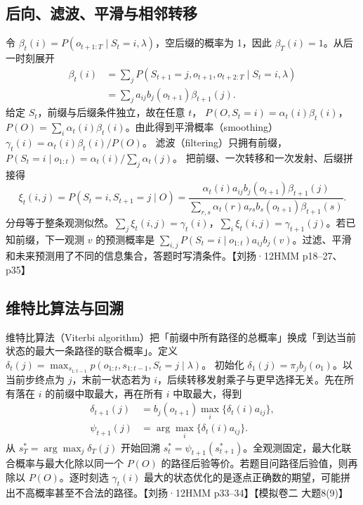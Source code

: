 \documentclass[UTF8,a4paper,zihao=-4,fontset=fandol]{ctexrep}
\begin{document}
\subsection{后向、滤波、平滑与相邻转移}
令 $\beta_t(i)=P(o_{t+1:T}\mid S_t=i,\lambda)$，空后缀的概率为 1，因此 $\beta_T(i)=1$。从后一时刻展开
\[
\begin{aligned}
\beta_t(i)
&=\sum_j P(S_{t+1}=j,o_{t+1},o_{t+2:T}\mid S_t=i,\lambda)\\
&=\sum_j a_{ij}b_j(o_{t+1})\beta_{t+1}(j).
\end{aligned}
\]
给定 $S_t$，前缀与后缀条件独立，故在任意 $t$，
$P(O,S_t=i)=\alpha_t(i)\beta_t(i)$，
$P(O)=\sum_i\alpha_t(i)\beta_t(i)$。由此得到平滑概率（smoothing）
$\gamma_t(i)=\alpha_t(i)\beta_t(i)/P(O)$。
滤波（filtering）只拥有前缀，$P(S_t=i\mid o_{1:t})=\alpha_t(i)/\sum_j\alpha_t(j)$。
把前缀、一次转移和一次发射、后缀拼接得
\[
\xi_t(i,j)=P(S_t=i,S_{t+1}=j\mid O)=
\frac{\alpha_t(i)a_{ij} b_j(o_{t+1})\beta_{t+1}(j)}
{\sum_{r,s}\alpha_t(r)a_{rs}b_s(o_{t+1})\beta_{t+1}(s)} .
\]
分母等于整条观测似然。$\sum_j\xi_t(i,j)=\gamma_t(i)$，$\sum_i\xi_t(i,j)=\gamma_{t+1}(j)$。若已知前缀，下一观测 $v$ 的预测概率是 $\sum_{i,j}P(S_t=i\mid o_{1:t})a_{ij}b_j(v)$。过滤、平滑和未来预测用了不同的信息集合，答题时写清条件。【刘扬·12HMM p18–27、p35】

\subsection{维特比算法与回溯}
维特比算法（Viterbi algorithm）把「前缀中所有路径的总概率」换成「到达当前状态的最大一条路径的联合概率」。定义
$\delta_t(j)=\max_{s_{1:t-1}}p(o_{1:t},s_{1:t-1},S_t=j\mid\lambda)$。
初始化 $\delta_1(j)=\pi_jb_j(o_1)$。以当前步终点为 $j$，末前一状态若为 $i$，后续转移发射乘子与更早选择无关。先在所有落在 $i$ 的前缀中取最大，再在所有 $i$ 中取最大，得到
\[
\begin{aligned}
\delta_{t+1}(j)&= b_j(o_{t+1})\max_i\{\delta_t(i)a_{ij}\},\\
\psi_{t+1}(j)&=\arg\max_i\{\delta_t(i)a_{ij}\}.
\end{aligned}
\]
从 $s_T^*=\arg\max_j\delta_T(j)$ 开始回溯 $s_t^*=\psi_{t+1}(s_{t+1}^*)$。全观测固定，最大化联合概率与最大化除以同一个 $P(O)$ 的路径后验等价。若题目问路径后验值，则再除以 $P(O)$。逐时刻选 $\gamma_t(i)$ 最大的状态优化的是逐点正确数的期望，可能拼出不高概率甚至不合法的路径。【刘扬·12HMM p33–34】【模拟卷二 大题8(9)】
\end{document}
